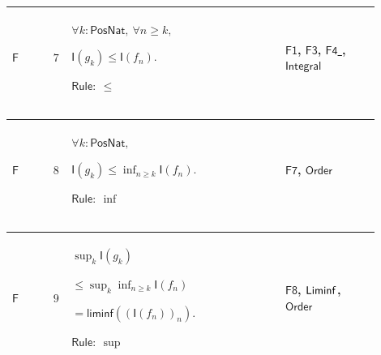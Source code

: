 \documentclass[12pt,reqno]{amsart}
\theoremstyle{blueplain}
\numberwithin{equation}{section}
\begin{document}
{\scriptsize \setlength{\parskip}{0pt}\nointerlineskip
\noindent 
\begin{tabular}{|@{}>{\centering\arraybackslash}m{0.10658\linewidth}|>{\centering\arraybackslash}m{0.03553\linewidth}|>{\centering\arraybackslash}m{0.52105\linewidth}|>{\centering\arraybackslash}m{0.23684\linewidth}|}
\hline
\hypertarget{proof:F7}{$\displaystyle \mathsf{F}$} & $\displaystyle 7$ & $%
\displaystyle \forall k:\mathsf{PosNat},\ \forall n\ge k,$\par$\displaystyle 
\mathsf{I}(g_k)\le\mathsf{I}(f_n).$\par$\displaystyle \mathsf{Rule}:\ \le$ & 
\hyperlink{proof:F1}{$\displaystyle \mathsf{F1}$}, \hyperlink{proof:F3}{$%
\displaystyle \mathsf{F3}$}, \hyperlink{proof:F4}{$\displaystyle \mathsf{F4}$%
}, \hyperlink{lem:Integral}{$\displaystyle \mathsf{Integral}$} \\ \hline
\end{tabular}%
}

{\scriptsize \setlength{\parskip}{0pt}\nointerlineskip
\noindent 
\begin{tabular}{|@{}>{\centering\arraybackslash}m{0.10658\linewidth}|>{\centering\arraybackslash}m{0.03553\linewidth}|>{\centering\arraybackslash}m{0.52105\linewidth}|>{\centering\arraybackslash}m{0.23684\linewidth}|}
\hline
\hypertarget{proof:F8}{$\displaystyle \mathsf{F}$} & $\displaystyle 8$ & $%
\displaystyle \forall k:\mathsf{PosNat},$\par$\displaystyle \mathsf{I}%
(g_k)\le\inf_{n\ge k}\mathsf{I}(f_n).$\par$\displaystyle \mathsf{Rule}:\
\inf $ & \hyperlink{proof:F7}{$\displaystyle \mathsf{F7}$}, \hyperlink{ax:Order}%
{$\displaystyle \mathsf{Order}$} \\ \hline
\end{tabular}%
}

{\scriptsize \setlength{\parskip}{0pt}\nointerlineskip
\noindent 
\begin{tabular}{|@{}>{\centering\arraybackslash}m{0.10658\linewidth}|>{\centering\arraybackslash}m{0.03553\linewidth}|>{\centering\arraybackslash}m{0.52105\linewidth}|>{\centering\arraybackslash}m{0.23684\linewidth}|}
\hline
\hypertarget{proof:F9}{$\displaystyle \mathsf{F}$} & $\displaystyle 9$ & $%
\displaystyle \sup_k\mathsf{I}(g_k)$\par$\displaystyle {}\le\sup_k\inf_{n\ge
k}\mathsf{I}(f_n)$\par$\displaystyle {}=\mathsf{liminf}((\mathsf{I}%
(f_n))_n). $\par$\displaystyle \mathsf{Rule}:\ \sup$ & \hyperlink{proof:F8}{$%
\displaystyle \mathsf{F8}$}, \hyperlink{def:Liminf}{$\displaystyle \mathsf{%
Liminf}$}, \hyperlink{ax:Order}{$\displaystyle \mathsf{Order}$} \\ \hline
\end{tabular}%
}
\end{document}
